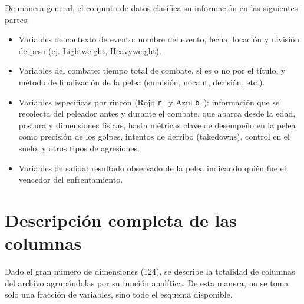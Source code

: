 \documentclass[11pt,a4paper]{article}
\begin{document}
De manera general, el conjunto de datos clasifica su información en las siguientes partes:

\begin{itemize}[leftmargin=*]
	\item Variables de contexto de evento: nombre del evento, fecha, locación y división de peso (ej. Lightweight, Heavyweight).
	\item Variables del combate: tiempo total de combate, si es o no por el título, y método de finalización de la pelea (sumisión, nocaut, decisión, etc.).
	\item Variables específicas por rincón (Rojo \texttt{r\_} y Azul \texttt{b\_}): información que se recolecta del peleador antes y durante el combate, que abarca desde la edad, postura y dimensiones físicas, hasta métricas clave de desempeño en la pelea como precisión de los golpes, intentos de derribo (takedowns), control en el suelo, y otros tipos de agresiones.
	\item Variables de salida: resultado observado de la pelea indicando quién fue el vencedor del enfrentamiento.
\end{itemize}

\section{Descripción completa de las columnas}

Dado el gran número de dimensiones (124), se describe la totalidad de columnas del archivo  agrupándolas por su función analítica. De esta manera, no se toma solo una fracción de variables, sino todo el esquema disponible.
\end{document}
